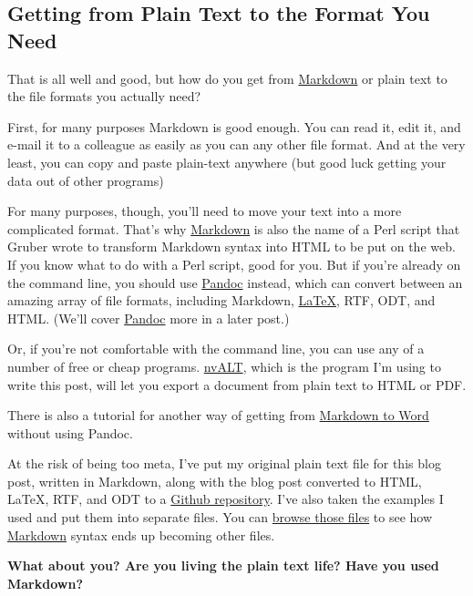 \subsection{Getting from Plain Text to the Format You Need}

That is all well and good, but how do you get from
\href{http://daringfireball.net/projects/markdown/}{Markdown} or plain
text to the file formats you actually need?

First, for many purposes Markdown is good enough. You can read it, edit
it, and e-mail it to a colleague as easily as you can any other file
format. And at the very least, you can copy and paste plain-text
anywhere (but good luck getting your data out of other programs)

For many purposes, though, you'll need to move your text into a more
complicated format. That's why
\href{http://daringfireball.net/projects/markdown/}{Markdown} is also
the name of a Perl script that Gruber wrote to transform Markdown syntax
into HTML to be put on the web. If you know what to do with a Perl
script, good for you. But if you're already on the command line, you
should use \href{http://johnmacfarlane.net/pandoc/}{Pandoc} instead,
which can convert between an amazing array of file formats, including
Markdown,
\href{http://chronicle.com/blogs/profhacker/getting-started-with-latex/23092}{LaTeX},
RTF, ODT, and HTML. (We'll cover
\href{http://johnmacfarlane.net/pandoc/}{Pandoc} more in a later post.)

Or, if you're not comfortable with the command line, you can use any of
a number of free or cheap programs.
\href{http://chronicle.com/blogs/profhacker/move-quickly-from-idea-to-draft-with-notational-velocity/35085}{nvALT},
which is the program I'm using to write this post, will let you export a
document from plain text to HTML or PDF.

There is also a tutorial for another way of getting from
\href{http://www.practicallyefficient.com/2011/07/21/word-internet/}{Markdown
to Word} without using Pandoc.

At the risk of being too meta, I've put my original plain text file for
this blog post, written in Markdown, along with the blog post converted
to HTML, LaTeX, RTF, and ODT to a
\href{https://github.com/lmullen/markdown-demonstration}{Github
repository}. I've also taken the examples I used and put them into
separate files. You can
\href{https://github.com/lmullen/markdown-demonstration}{browse those
files} to see how
\href{http://daringfireball.net/projects/markdown/}{Markdown} syntax
ends up becoming other files.

\textbf{What about you? Are you living the plain text life? Have you
used Markdown?}
